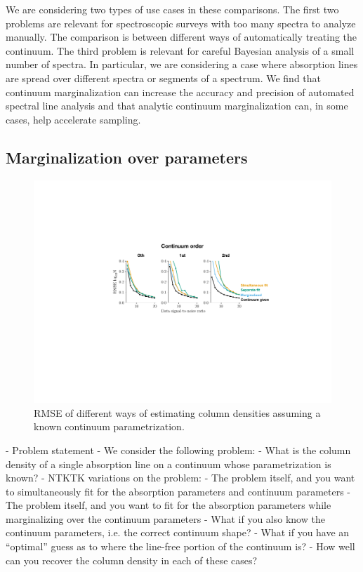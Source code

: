 \documentclass[manuscript]{aastex62}
\begin{document}
We are considering two types of use cases in these comparisons.
The first two problems are relevant for spectroscopic surveys with too many spectra to analyze manually.
The comparison is between different ways of automatically treating the continuum.
The third problem is relevant for careful Bayesian analysis of a small number of spectra.
In particular, we are considering a case where absorption lines are spread over different spectra or segments of a spectrum.
We find that continuum marginalization can increase the accuracy and precision of automated spectral line analysis and that analytic continuum marginalization can, in some cases, help accelerate sampling.

\subsection{Marginalization over parameters}
\begin{figure}
  \includegraphics[width=\linewidth]{figures/marginalized_unmarginalized_labeled.pdf}
  \caption{RMSE of different ways of estimating column densities assuming a known continuum parametrization.}
  \label{fig:order-known-comparison}
\end{figure}

- Problem statement
  - We consider the following problem:
    - What is the column density of a single absorption line on a continuum whose parametrization is known?
    - NTKTK variations on the problem:
      - The problem itself, and you want to simultaneously fit for the absorption parameters and continuum parameters
      - The problem itself, and you want to fit for the absorption parameters while marginalizing over the continuum parameters
      - What if you also know the continuum parameters, i.e. the correct continuum shape?
      - What if you have an ``optimal'' guess as to where the line-free portion of the continuum is?
    - How well can you recover the column density in each of these cases?
\end{document}

